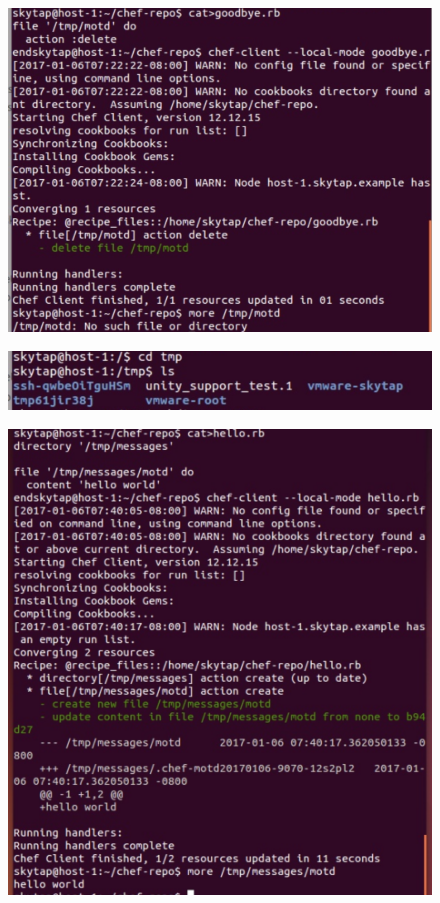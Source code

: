 \documentclass[12pt,letterpaper,boxed]{hmcpset}
\begin{document}
\begin{figure}[H]
  \centering
  \includegraphics[width = 1.0\textwidth]{10.png}
\end{figure}
\begin{figure}[H]
  \centering
  \includegraphics[width = 1.0\textwidth]{11.png}
\end{figure}
\begin{figure}[H]
  \centering
  \includegraphics[width = 1.0\textwidth]{12.png}
\end{figure}
\end{document}
